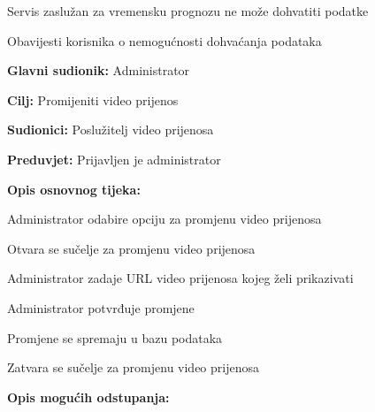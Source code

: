 \begin{packed_item}
\begin{packed_item}
							\item[6.a] Servis zaslužan za vremensku prognozu ne može dohvatiti podatke
							\item[] \begin{packed_enum}
								
								\item Obavijesti korisnika o nemogućnosti dohvaćanja podataka
								
							\end{packed_enum}
							
						\end{packed_item}
					\end{packed_item}
					
					\noindent {}
					\begin{packed_item}
						
						\item \textbf{Glavni sudionik: }Administrator
						\item  \textbf{Cilj:} Promijeniti video prijenos
						\item  \textbf{Sudionici:} Poslužitelj video prijenosa
						\item  \textbf{Preduvjet:} Prijavljen je administrator
						\item  \textbf{Opis osnovnog tijeka:}
						
						\item[] \begin{packed_enum}
							
							\item Administrator odabire opciju za promjenu video prijenosa
							\item Otvara se sučelje za promjenu video prijenosa
							\item Administrator zadaje URL video prijenosa kojeg želi prikazivati
							\item Administrator potvrđuje promjene
							\item Promjene se spremaju u bazu podataka
							\item Zatvara se sučelje za promjenu video prijenosa
						\end{packed_enum}
						
						\item  \textbf{Opis mogućih odstupanja:}
						
						\item[] \begin{packed_item}
							

\end{packed_item}
\end{packed_item}
